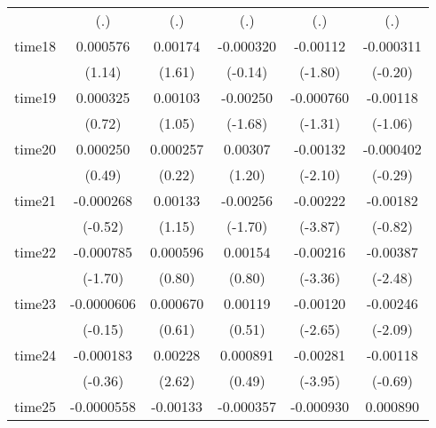 \begin{table}[htbp]
\begin{tabular}{l*{5}{c}}
            &         (.)         &         (.)         &         (.)         &         (.)         &         (.)         \\
time18      &    0.000576         &     0.00174         &   -0.000320         &    -0.00112         &   -0.000311         \\
            &      (1.14)         &      (1.61)         &     (-0.14)         &     (-1.80)         &     (-0.20)         \\
time19      &    0.000325         &     0.00103         &    -0.00250         &   -0.000760         &    -0.00118         \\
            &      (0.72)         &      (1.05)         &     (-1.68)         &     (-1.31)         &     (-1.06)         \\
time20      &    0.000250         &    0.000257         &     0.00307         &    -0.00132\sym{*}  &   -0.000402         \\
            &      (0.49)         &      (0.22)         &      (1.20)         &     (-2.10)         &     (-0.29)         \\
time21      &   -0.000268         &     0.00133         &    -0.00256         &    -0.00222\sym{***}&    -0.00182         \\
            &     (-0.52)         &      (1.15)         &     (-1.70)         &     (-3.87)         &     (-0.82)         \\
time22      &   -0.000785         &    0.000596         &     0.00154         &    -0.00216\sym{***}&    -0.00387\sym{*}  \\
            &     (-1.70)         &      (0.80)         &      (0.80)         &     (-3.36)         &     (-2.48)         \\
time23      &  -0.0000606         &    0.000670         &     0.00119         &    -0.00120\sym{**} &    -0.00246\sym{*}  \\
            &     (-0.15)         &      (0.61)         &      (0.51)         &     (-2.65)         &     (-2.09)         \\
time24      &   -0.000183         &     0.00228\sym{**} &    0.000891         &    -0.00281\sym{***}&    -0.00118         \\
            &     (-0.36)         &      (2.62)         &      (0.49)         &     (-3.95)         &     (-0.69)         \\
time25      &  -0.0000558         &    -0.00133         &   -0.000357         &   -0.000930         &    0.000890         \\

\end{tabular}
\end{table}
